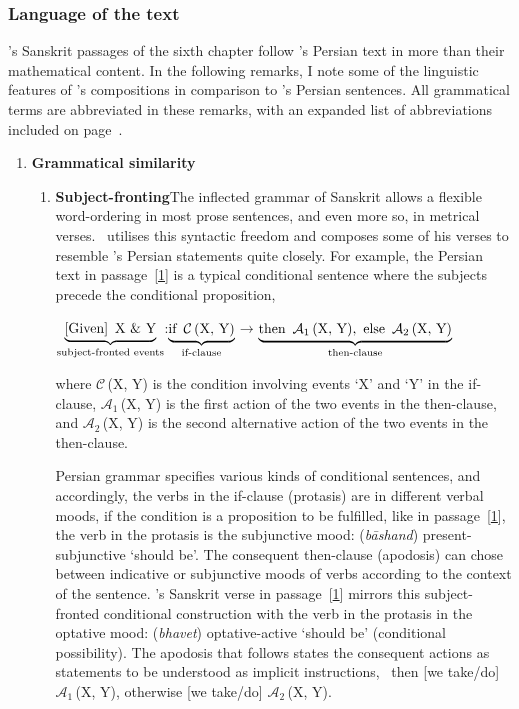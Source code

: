\subsubsection{Language of the text} \label{language_content_zij_sindhu_chapter_six}
\Nityananda's Sanskrit passages of the sixth chapter follow \MullaFarid's  Persian text in more than their mathematical content. In the following remarks, I note some of the linguistic features of \Nityananda's compositions in comparison to \MullaFarid's Persian sentences. All grammatical terms are abbreviated in these remarks, with an expanded list of abbreviations included on page~\pageref{acronym}. 
\begin{enumerate}[topsep=0pt]
    \item \textbf{Grammatical similarity}
    \begin{enumerate}[topsep=0pt]
    \item  \label{subject_fronting_passage_1} \textbf{Subject-fronting}\quad  The inflected grammar of Sanskrit allows a flexible word-ordering in most prose sentences, and even more so, in metrical verses. \Nityananda\ utilises this syntactic freedom and composes some of his verses to resemble \MullaFarid's Persian statements quite closely. For example,
    the Persian text in passage~[\hyperlink{Ppass1}{1}] is a typical conditional sentence where the subjects precede the conditional proposition, \viz
    {\par\centering
    $\underbrace{\text{[Given]\enskip X \& Y}}_{\text{subject-fronted events}}$\quad:\quad $\underbrace{\text{if\enskip $\mathcal{C}$\,(X, Y)}}_{\text{if-clause}}$\quad $\longrightarrow$\quad $\underbrace{\text{then\enskip $\mathcal{A}_\text{1}$\,(X, Y),\enskip else\enskip $\mathcal{A}_\text{2}$\,(X, Y)}}_{\text{then-clause}}$\par}    
    where $\mathcal{C}$\,(X, Y) is the condition involving events `X' and `Y' in the if-clause, $\mathcal{A}_\text{1}$\,(X, Y) is the first action of the two events in the then-clause, and $\mathcal{A}_\text{2}$\,(X, Y) is the second alternative action of the two events in the then-clause. 
    
    Persian grammar specifies various kinds of conditional sentences, and accordingly, the verbs in the if-clause (protasis) are in different verbal moods, \eg if the condition is a proposition to be fulfilled, like in passage~[\hyperlink{Ppass1}{1}], the verb in the protasis is the subjunctive mood:  (\textit{bāshand})  \acrshort{present}-\acrshort{subjunctive} `should be'. The consequent then-clause (apodosis) can chose between indicative or subjunctive moods of verbs according to the context of the sentence. \Nityananda's Sanskrit verse in passage~[\hyperlink{Spass1}{1}] mirrors this subject-fronted conditional construction with the verb in the protasis in the optative mood:  (\textit{bhavet}) \acrshort{optative}-\acrshort{active} `should be' (conditional possibility). The apodosis that follows states the consequent actions as statements to be understood as implicit instructions, \viz\ then [we take/do] $\mathcal{A}_\text{1}$\,(X, Y), otherwise [we take/do] $\mathcal{A}_\text{2}$\,(X, Y).
    

\end{enumerate}
\end{enumerate}

